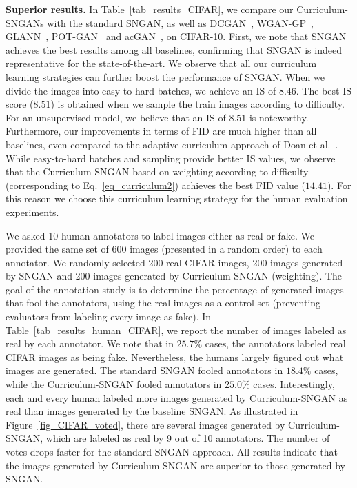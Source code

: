 \documentclass[10pt,twocolumn,letterpaper]{article}
\begin{document}
\noindent
{\bf Superior results.}
In Table~\ref{tab_results_CIFAR}, we compare our Curriculum-SNGANs with the standard SNGAN, as well as DCGAN~\cite{Radford-ICLR-2016}, WGAN-GP~\cite{Gulrajani-NIPS-2017}, GLANN~\cite{Hoshen-CVPR-2019}, POT-GAN~\cite{Avraham-CVPR-2019} and acGAN~\cite{Doan-AAAI-2019}, on CIFAR-10. First, we note that SNGAN achieves the best results among all baselines, confirming that SNGAN is indeed representative for the state-of-the-art. We observe that all our curriculum learning strategies can further boost the performance of SNGAN. When we divide the images into easy-to-hard batches, we achieve an IS of $8.46$. The best IS score ($8.51$) is obtained when we sample the train images according to difficulty. For an unsupervised model, we believe that an IS of $8.51$ is noteworthy. Furthermore, our improvements in terms of FID are much higher than all baselines, even compared to the adaptive curriculum approach of Doan et al.~\cite{Doan-AAAI-2019}. While easy-to-hard batches and sampling provide better IS values, we observe that the Curriculum-SNGAN based on weighting according to difficulty (corresponding to Eq.~\eqref{eq_curriculum2}) achieves the best FID value ($14.41$). For this reason we choose this curriculum learning strategy for the human evaluation experiments.

We asked 10 human annotators to label images either as real or fake. We provided the same set of 600 images (presented in a random order) to each annotator. We randomly selected 200 real CIFAR images, 200 images generated by SNGAN and 200 images generated by Curriculum-SNGAN (weighting). The goal of the annotation study is to determine the percentage of generated images that fool the annotators, using the real images as a control set (preventing evaluators from labeling every image as fake). In Table~\ref{tab_results_human_CIFAR}, we report the number of images labeled as real by each annotator. We note that in $25.7\%$ cases, the annotators labeled real CIFAR images as being fake. Nevertheless, the humans largely figured out what images are generated. The standard SNGAN fooled annotators in $18.4\%$ cases, while the Curriculum-SNGAN fooled annotators in $25.0\%$ cases. Interestingly, each and every human labeled more images generated by Curriculum-SNGAN as real than images generated by the baseline SNGAN. As illustrated in Figure~\ref{fig_CIFAR_voted}, there are several images generated by Curriculum-SNGAN, which are labeled as real by 9 out of 10 annotators. The number of votes drops faster for the standard SNGAN approach. All results indicate that the images generated by Curriculum-SNGAN are superior to those generated by SNGAN.
\end{document}
